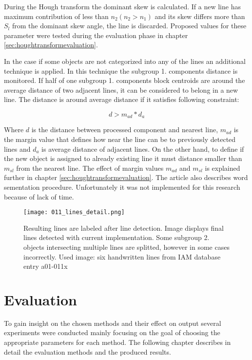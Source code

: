 \documentclass{article}
\begin{document}
            During the Hough transform the dominant skew is calculated. If a new line has maximum contribution of less than $n_2 (n_2 > n_1)$ and its skew differs more than $S_l$ from the dominant skew angle, the line is discarded. Proposed values for these parameter were tested during the evaluation phase in chapter \ref{sec:houghtransformevaluation}.

            In the case if some objects are not categorized into any of the lines an additional technique is applied. In this technique the subgroup 1. components distance is monitored. If half of one subgroup 1. components block centroids are around the average distance of two adjacent lines, it can be considered to belong in a new line. The distance is around average distance if it satisfies following constraint:

            \begin{equation}
              d >  m_{ad}*d_a
            \end{equation}

            Where $d$ is the distance between processed component and nearest line, $m_{ad}$ is the margin value that defines how near the line can be to previously detected lines and $d_a$ is average distance of adjacent lines. On the other hand, to define if the new object is assigned to already existing line it must distance smaller than $m_{sl}$ from the nearest line. The effect of margin values $m_{ad}$ and $m_{sl}$ is explained further in chapter \ref{sec:houghtransformevaluation}. The article \cite{Louloudis2} also describes word sementation procedure. Unfortunately it was not implemented for this research because of lack of time.

            \begin{figure}[!ht]
              \centering
              \texttt{[image: 011\_lines\_detail.png]}
              \caption{Resulting lines are labeled after line detection. Image displays final lines detected with current implementation. Some subgroup 2. objects intersecting multiple lines are splitted, however in some cases incorrectly. Used image: six handwritten lines from IAM database entry a01-011x \label{fig:finallines} }
            \end{figure}

  \newpage
  \section{Evaluation}
    To gain insight on the chosen methods and their effect on output several experiments were conducted mainly focusing on the goal of choosing the appropriate parameters for each method. The following chapter describes in detail the evaluation methods and the produced results.
\end{document}
